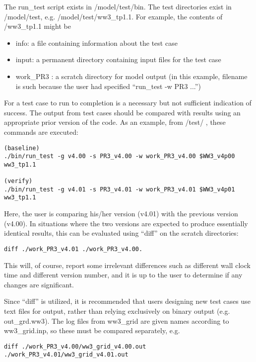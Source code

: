 \documentclass[12pt]{article}
\newcommand{\file}{\sf}
\begin{document}
The {\file run\_test} script exists in {\file /model/test/bin}. The test
directories exist in {\file /model/test}, e.g.  {\file/model/test/ww3\_tp1.1}. For
example, the contents of {\file /ww3\_tp1.1} might be
  \begin{itemize}
\item {\file info}: a file containing information
about the test case 
\item {\file input}: a permanent directory containing input files for
the test case 
\item {\file work\_PR3} : a scratch directory for model output (in this
example, filename is such because the user had specified ``{\file run\_test -w PR3
...''})
  \end{itemize}

For a test case to run to completion is a necessary but not sufficient
indication of success. The output from test cases should be compared with
results using an appropriate prior version of the code. As an example, from
{\file/test/} , these commands are executed:
\begin{center}
{\small \begin{verbatim}
(baseline)
./bin/run_test -g v4.00 -s PR3_v4.00 -w work_PR3_v4.00 $WW3_v4p00 ww3_tp1.1

(verify)
./bin/run_test -g v4.01 -s PR3_v4.01 -w work_PR3_v4.01 $WW3_v4p01 ww3_tp1.1
\end{verbatim}}
\end{center}
\noindent
Here, the user is comparing his/her version (v4.01) with the previous version
(v4.00). In situations where the two versions are expected to produce
essentially identical results, this can be evaluated using ``diff'' on the
scratch directories:
\begin{center}
{\small \begin{verbatim}
diff ./work_PR3_v4.01 ./work_PR3_v4.00.
\end{verbatim}}
\end{center}
\noindent
This will, of course, report some irrelevant differences such as different
wall clock time and different version number, and it is up to the user to
determine if any changes are significant.

Since ``diff'' is utilized, it is recommended that users designing new test
cases use text files for output, rather than relying exclusively on binary
output (e.g. {\file out\_grd.ww3}). The log files from ww3\_grid are given
names according to {\file ww3\_grid.inp}, so these must be compared separately, e.g.
\begin{center}
{\small \begin{verbatim}
diff ./work_PR3_v4.00/ww3_grid_v4.00.out ./work_PR3_v4.01/ww3_grid_v4.01.out
\end{verbatim}}
\end{center}
\end{document}
